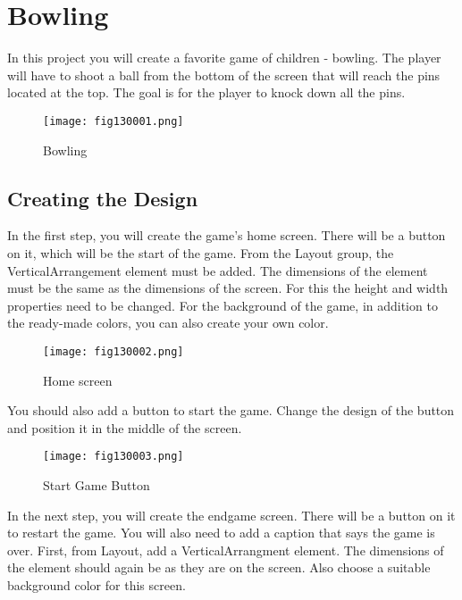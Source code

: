 \chapter{Bowling}

In this project you will create a favorite game of children - bowling. The player will have to shoot a ball from the bottom of the screen that will reach the pins located at the top. The goal is for the player to knock down all the pins.

\begin{figure}[H]
   \centering
   \texttt{[image: fig130001.png]}
   \caption{Bowling}
\label{fig130001}
\end{figure}

\section{Creating the Design}

In the first step, you will create the game's home screen. There will be a button on it, which will be the start of the game. From the Layout group, the VerticalArrangement element must be added. The dimensions of the element must be the same as the dimensions of the screen. For this the height and width properties need to be changed. For the background of the game, in addition to the ready-made colors, you can also create your own color.

\begin{figure}[H]
   \centering
   \texttt{[image: fig130002.png]}
   \caption{Home screen}
\label{fig130002}
\end{figure}

You should also add a button to start the game. Change the design of the button and position it in the middle of the screen.

\begin{figure}[H]
   \centering
   \texttt{[image: fig130003.png]}
   \caption{Start Game Button}
\label{fig130003}
\end{figure}

In the next step, you will create the endgame screen. There will be a button on it to restart the game. You will also need to add a caption that says the game is over. First, from Layout, add a VerticalArrangment element. The dimensions of the element should again be as they are on the screen. Also choose a suitable background color for this screen.

